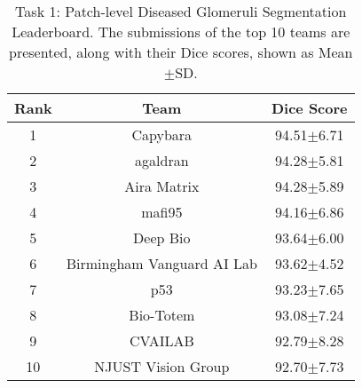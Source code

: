 \begin{table}[t]
\caption{Task 1: Patch-level Diseased Glomeruli Segmentation Leaderboard. The submissions of the top 10 teams are presented, along with their Dice scores, shown as Mean$\pm$SD.}
\centering
\scriptsize
\setlength{\tabcolsep}{4mm}
\renewcommand\arraystretch{1}
\begin{tabular}{c|c|c}
\toprule
Rank & Team & Dice Score \\
\midrule
1 & Capybara & 94.51$\pm$6.71 \\
2 & agaldran & 94.28$\pm$5.81 \\
3 & Aira Matrix & 94.28$\pm$5.89 \\
4 & mafi95 & 94.16$\pm$6.86\\
5 & Deep Bio & 93.64$\pm$6.00 \\
6 & Birmingham Vanguard AI Lab & 93.62$\pm$4.52 \\
7 & p53 & 93.23$\pm$7.65 \\
8 & Bio-Totem & 93.08$\pm$7.24 \\
9 & CVAILAB & 92.79$\pm$8.28 \\
10 & NJUST Vision Group & 92.70$\pm$7.73 \\
\bottomrule
\end{tabular}
\label{tab:Task1Dice}
\end{table}

